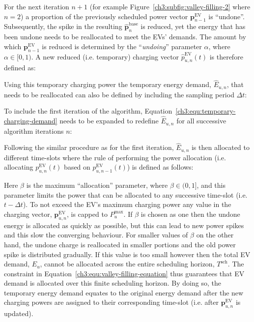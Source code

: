 For the next iteration $n+1$ (for example Figure~\ref{ch3:subfig:valley-filling-2} where $n=2$) a proportion of the previously scheduled power vector $\textbf{p}^\text{EV}_{n-1}$ is ``undone''.
Subsequently, the spike in the resulting $\hat{\textbf{p}}^\text{base}_{n}$ is reduced, yet the energy that has been undone needs to be reallocated to meet the EVs' demands.
The amount by which $\textbf{p}^\text{EV}_{n-1}$ is reduced is determined by the ``\textit{undoing}'' parameter $\alpha$, where $\alpha \in [0, 1)$.
A new reduced (i.e. temporary) charging vector $\hat{p}^\text{EV}_{u, n}(t)$ is therefore defined as:



Using this temporary charging power the temporary energy demand, $\hat{E}_{u,n}$, that needs to be reallocated can also be defined by including the sampling period $\Delta t$:



To include the first iteration of the algorithm, Equation~\ref{ch3:equ:temporary-charging-demand} needs to be expanded to redefine $\hat{E}_{u,n}$ for all successive algorithm iterations $n$:



Following the similar procedure as for the first iteration, $\hat{E}_{u,n}$ is then allocated to different time-slots where the rule of performing the power allocation (i.e. allocating $p^\text{EV}_{u,n}(t)$ based on $p^\text{EV}_{u,n-1}(t)$) is defined as follows:



\nomenclature[K]{$\alpha$}{Undoing parameter to remove a portion of the temporary energy demand, $\hat{E}_{u,n}$, where $\alpha \in (0, 1]$}
\nomenclature[K]{$\beta$}{Allocation parameter to assign a portion of the temporary energy demand, $\hat{E}_{u,n}$, where $\beta \in (0, 1]$}

Here $\beta$ is the maximum ``allocation'' parameter, where $\beta \in (0, 1]$, and this parameter limits the power that can be allocated to any successive time-slot (i.e. $t-\Delta t$).
To not exceed the EV's maximum charging power any value in the charging vector, $\textbf{p}^\text{EV}_{u,n}$, is capped to $P^\text{max}_{u}$.
If $\beta$ is chosen as one then the undone energy is allocated as quickly as possible, but this can lead to new power spikes and this slow the converging behaviour.
For smaller values of $\beta$ on the other hand, the undone charge is reallocated in smaller portions and the old power spike is distributed gradually.
If this value is too small however then the total EV demand, $E_u$, cannot be allocated across the entire scheduling horizon, $T^\text{sch}$.
The constraint in Equation~\ref{ch3:equ:valley-filling-equation} thus guarantees that EV demand is allocated over this finite scheduling horizon.
By doing so, the temporary energy demand equates to the original energy demand after the new charging powers are assigned to their corresponding time-slot (i.e. after $\textbf{p}^\text{EV}_{u,n}$ is updated).

